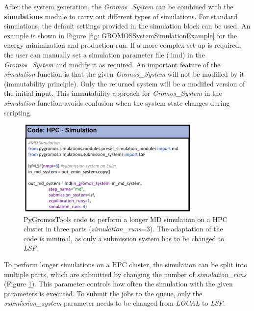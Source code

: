 After the system generation, the \textit{Gromos\_System} can be combined with the \textbf{simulations} module to carry out different types of simulations. For standard simulations, the default settings provided in the simulation block can be used. An example is shown in Figure \ref{fig: GROMOSSystemSimulationExample} for the energy minimization and production run. If a more complex set-up is required, the user can manually set a simulation parameter file (.imd) in the \textit{Gromos\_System} and modify it as required. An important feature of the \textit{simulation} function is that the given \textit{Gromos\_System} will not be modified by it (immutability principle). Only the returned system will be a modified version of the initial input. This immutability approach for \textit{Gromos\_System} in the \textit{simulation} function avoids confusion when the system state changes during scripting. 

\begin{figure}[h!]
    \centering
    \includegraphics[width=0.8\textwidth]{fig/ApplicationExamples/codeExample_GROMOSSystemHPCSimulation.png}
    \caption{PyGromosTools code to perform a longer MD simulation on a HPC cluster in three parts (\textit{simulation\_runs}=3). The adaptation of the code is minimal, as only a submission system has to be changed to \textit{LSF}.}
    \label{fig: GROMOSSystemSimulationHPCExample}
\end{figure}

To perform longer simulations on a HPC cluster, the simulation can be split into multiple parts, which are submitted by changing the number of \textit{simulation\_runs} (Figure \ref{fig: GROMOSSystemSimulationHPCExample}). This parameter controls how often the simulation with the given parameters is executed. To submit the jobs to the queue, only the \textit{submission\_system} parameter needs to be changed from \textit{LOCAL} to \textit{LSF}.



\FloatBarrier


